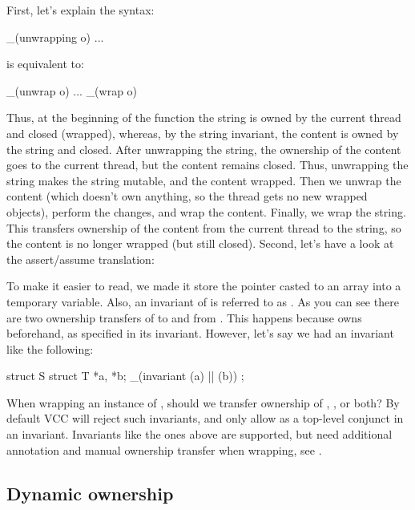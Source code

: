 
\noindent
First, let's explain the syntax:
\begin{VCC}
_(unwrapping o) { ... }
\end{VCC}
is equivalent to:
\begin{VCC}
_(unwrap o) { ... } _(wrap o)
\end{VCC}
Thus, at the beginning of the function the string is owned by the current thread and closed (\ie wrapped),
whereas, by the string invariant, the content is owned by the string and closed.
After unwrapping the string, the ownership of the content goes to the current thread,
but the content remains closed.
Thus, unwrapping the string makes the string mutable, and the content wrapped.
Then we unwrap the content (which doesn't own anything, so the thread gets no new wrapped objects), perform the changes,
and wrap the content.
Finally, we wrap the string.
This transfers ownership of the content from the current thread to the string, so the content is no longer wrapped (but still closed).
Second, let's have a look at the assert\slash assume translation:


\noindent
To make it easier to read, we made it store the  pointer
casted to an array into a temporary variable.
Also, an invariant of  is referred to as .
As you can see there are two ownership transfers
of  to and from \vcc{\me}.
This happens because  owns  beforehand,
as specified in its invariant.
However, let's say we had an invariant like the following:
\begin{VCC}
struct S {
  struct T *a, *b;
  _(invariant \mine(a) || \mine(b))
};
\end{VCC}
When wrapping an instance of , should we transfer ownership of , , or both?
By default VCC will reject such invariants, and only allow 
as a top-level conjunct in an invariant.
Invariants like the ones above are supported, but need additional annotation
and manual ownership transfer when wrapping, see .


\subsection{Dynamic ownership}
\label{sect:dynamic-ownership}

